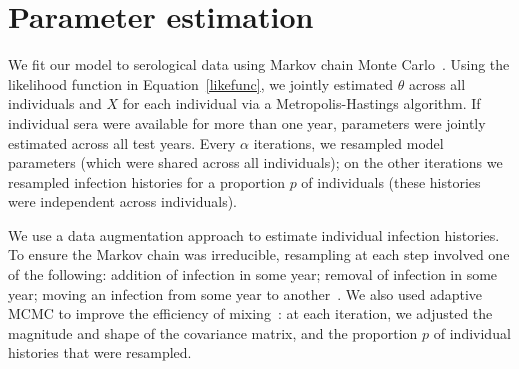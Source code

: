 \documentclass[12pt]{article}
\begin{document}
\section{Parameter estimation}

We fit our model to serological data using Markov chain Monte Carlo~\cite{gilks1996markov}. Using the likelihood function in Equation~\ref{likefunc}, we jointly estimated $\theta$ across all individuals and $X$ for each individual via a Metropolis-Hastings algorithm. If individual sera were available for more than one year, parameters were jointly estimated across all test years. Every $\alpha$ iterations, we resampled model parameters (which were shared across all individuals); on the other iterations we resampled infection histories for a proportion $p$ of individuals (these histories were independent across individuals).

We use a data augmentation approach to estimate individual infection histories. To ensure the Markov chain was irreducible, resampling at each step involved one of the following: addition of infection in some year; removal of infection in some year; moving an infection from some year to another~\cite{gibson1998estimating}. We also used adaptive MCMC to improve the efficiency of mixing~\cite{Roberts:2009wg}: at each iteration, we adjusted the magnitude and shape of the covariance matrix, and the proportion $p$ of individual histories that were resampled.




\end{document}
